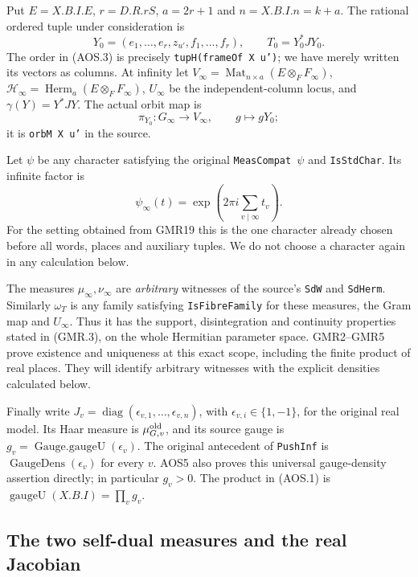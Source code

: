 Put $E=X.B.I.E$, $r=D.R.rS$, $a=2r+1$ and $n=X.B.I.n=k+a$.
The rational ordered tuple under consideration is
\[
 Y_0=(e_1,\ldots,e_r,z_{u'},f_1,\ldots,f_r),
 \qquad T_0=Y_0^*JY_0.
 \tag{AOS.3}
\]
The order in (AOS.3) is precisely \texttt{tupH(frameOf X u')};
we have merely written its vectors as columns.  At infinity let
$V_\infty=\operatorname{Mat}_{n\times a}(E\otimes_F F_\infty)$,
$\mathcal H_\infty=\operatorname{Herm}_a(E\otimes_F F_\infty)$,
$U_\infty$ be the independent-column locus, and
$\gamma(Y)=Y^*JY$.  The actual orbit map is
\[
 \pi_{Y_0}:G_\infty\longrightarrow V_\infty,
       \qquad g\longmapsto gY_0;
 \tag{AOS.4}
\]
it is \texttt{orbM X u'} in the source.

Let $\psi$ be any character satisfying the original
\texttt{MeasCompat\,$\psi$} and \texttt{IsStdChar}.  Its infinite
factor is
\[
       \psi_\infty(t)=\exp\left(2\pi i\sum_{v\mid\infty}t_v\right).
 \tag{AOS.5}
\]
For the setting obtained from GMR19 this is the one character already
chosen before all words, places and auxiliary tuples.  We do not
choose a character again in any calculation below.

The measures $\mu_\infty,\nu_\infty$ are \emph{arbitrary} witnesses of
the source's \texttt{SdW} and \texttt{SdHerm}.  Similarly
$\omega_T$ is any family satisfying \texttt{IsFibreFamily} for these
measures, the Gram map and $U_\infty$.  Thus it has the support,
disintegration and continuity properties stated in (GMR.3), on the
whole Hermitian parameter space.  GMR2--GMR5 prove existence and
uniqueness at this exact scope, including the finite product of real
places.  They will identify arbitrary witnesses with the explicit
densities calculated below.

Finally write $J_v=\operatorname{diag}(\epsilon_{v,1},\ldots,
\epsilon_{v,n})$, with $\epsilon_{v,i}\in\{1,-1\}$, for the original
real model.  Its Haar measure is $\mu_{G,v}^{\rm old}$, and its
source gauge is $g_v=\operatorname{Gauge.gaugeU}(\epsilon_v)$.
The original antecedent of \texttt{PushInf} is
$\operatorname{GaugeDens}(\epsilon_v)$ for every $v$.
AOS5 also proves this universal gauge-density assertion directly;
in particular $g_v>0$.  The product in (AOS.1) is
$\operatorname{gaugeU}(X.B.I)=\prod_v g_v$.

\subsection{The two self-dual measures and the real Jacobian}

